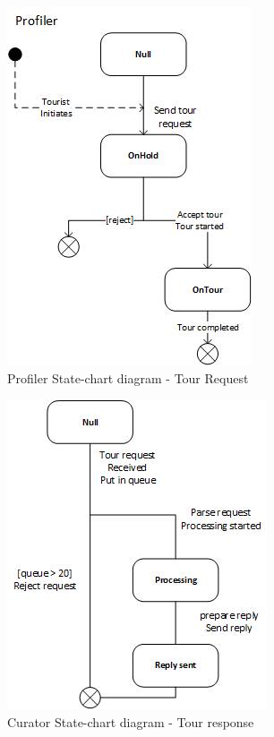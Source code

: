 \documentclass[a4paper, 11pt]{article}
\begin{document}
\begin{figure}[H]
	\caption{Profiler State-chart diagram - Tour Request}
	\centering
	\includegraphics[scale=0.9]{./images/profilerUML.jpg}
\end{figure}
\begin{figure}[H]
	\caption{Curator State-chart diagram - Tour response}
	\centering
	\includegraphics[scale=0.9]{./images/curator2UML.jpg}
\end{figure}
\end{document}
